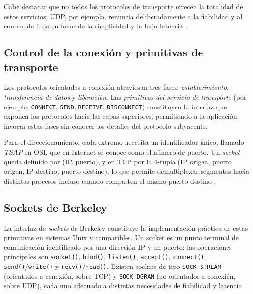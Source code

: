 \documentclass[conference]{IEEEtran}
\begin{document}
Cabe destacar que no todos los protocolos de transporte ofrecen la totalidad de estos servicios; UDP, por ejemplo, renuncia deliberadamente a la fiabilidad y al control de flujo en favor de la simplicidad y la baja latencia \cite{fuoc}.

\subsection{Control de la conexión y primitivas de transporte}

Los protocolos orientados a conexión atraviesan tres fases: \emph{establecimiento}, \emph{transferencia de datos} y \emph{liberación}. Las \textit{primitivas del servicio de transporte} (por ejemplo, \texttt{CONNECT}, \texttt{SEND}, \texttt{RECEIVE}, \texttt{DISCONNECT}) constituyen la interfaz que exponen los protocolos hacia las capas superiores, permitiendo a la aplicación invocar estas fases sin conocer los detalles del protocolo subyacente.

Para el direccionamiento, cada extremo necesita un identificador único, llamado \textit{TSAP} en OSI, que en Internet se conoce como el número de puerto. Un \textit{socket} queda definido por (IP, puerto), y en TCP por la 4-tupla (IP origen, puerto origen, IP destino, puerto destino), lo que permite demultiplexar segmentos hacia distintos procesos incluso cuando comparten el mismo puerto destino \cite{kurose}.

\subsection{Sockets de Berkeley}

La interfaz de \textit{sockets} de Berkeley constituye la implementación práctica de estas primitivas en sistemas Unix y compatibles. Un socket es un punto terminal de comunicación identificado por una dirección IP y un puerto; las operaciones principales son \texttt{socket()}, \texttt{bind()}, \texttt{listen()}, \texttt{accept()}, \texttt{connect()}, \texttt{send()}/\texttt{write()} y \texttt{recv()}/\texttt{read()}. Existen sockets de tipo \texttt{SOCK\_STREAM} (orientados a conexión, sobre TCP) y \texttt{SOCK\_DGRAM} (no orientados a conexión, sobre UDP), cada uno adecuado a distintas necesidades de fiabilidad y latencia.\\
\end{document}
